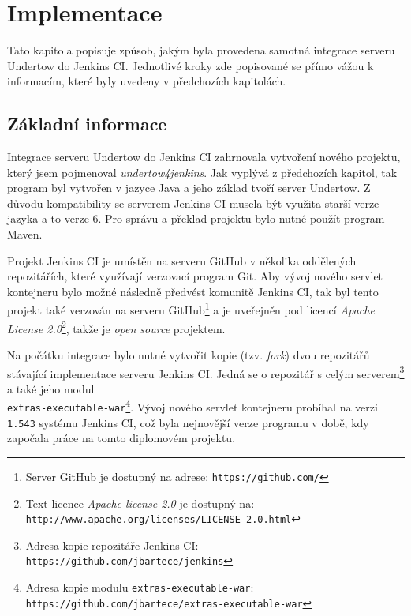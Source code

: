 \chapter{Implementace}  \label{kapImpl}
    Tato kapitola popisuje způsob, jakým byla provedena samotná integrace serveru Undertow do Jenkins CI.
    Jednotlivé kroky zde popisované se přímo vážou k informacím, které byly uvedeny v předchozích kapitolách.

    

    
    \section{Základní informace}
        Integrace serveru Undertow do Jenkins CI zahrnovala vytvoření nového projektu, který 
        jsem pojmenoval \emph{undertow4jenkins}. 
        Jak vyplývá z předchozích kapitol, tak program byl vytvořen v jazyce Java a jeho základ 
        tvoří server Undertow. 
        Z důvodu kompatibility se serverem Jenkins CI musela být využita starší verze jazyka a to verze 6.
        Pro správu a překlad projektu bylo nutné použít program Maven. 
        
        Projekt Jenkins CI je umístěn na serveru GitHub v několika oddělených repozitářích, které
        využívají verzovací program Git. Aby vývoj nového servlet kontejneru bylo možné následně předvést 
        komunitě Jenkins CI, tak byl tento projekt také verzován na serveru GitHub\footnote{Server GitHub je 
        dostupný na adrese: \texttt{https://github.com/}} 
        a je uveřejněn pod licencí \emph{Apache License 2.0}\footnote{Text licence \emph{Apache license 2.0} je dostupný na: 
        \texttt{http://www.apache.org/licenses/LICENSE-2.0.html}}, takže je \emph{open source} projektem.

        Na počátku integrace bylo nutné vytvořit kopie (tzv. \emph{fork}) dvou repozitářů stávající implementace serveru Jenkins CI.
        Jedná se o repozitář s celým serverem\footnote{Adresa kopie repozitáře Jenkins CI: 
        \texttt{https://github.com/jbartece/jenkins}} a také jeho modul 
        \\\texttt{extras-executable-war}\footnote{Adresa kopie modulu \texttt{extras-executable-war}:
        \texttt{https://github.com/jbartece/extras-executable-war} }.
        Vývoj nového servlet kontejneru probíhal na verzi \texttt{1.543} systému Jenkins CI, což byla nejnovější verze
        programu v době, kdy započala práce na tomto diplomovém projektu. 
        
